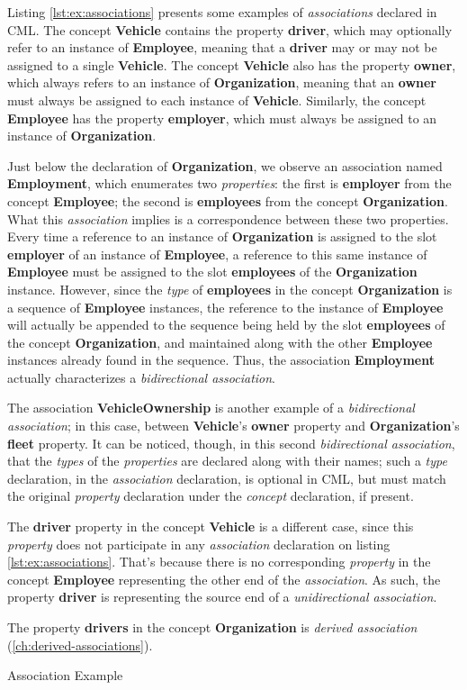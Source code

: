 Listing \ref{lst:ex:associations} presents some examples of \emph{associations} declared in CML.
The concept \textbf{Vehicle} contains the property \textbf{driver},
which may optionally refer to an instance of \textbf{Employee},
meaning that a \textbf{driver} may or may not be assigned to a single \textbf{Vehicle}.
The concept \textbf{Vehicle} also has the property \textbf{owner},
which always refers to an instance of \textbf{Organization},
meaning that an \textbf{owner} must always be assigned to each instance of \textbf{Vehicle}.
Similarly,
the concept \textbf{Employee} has the property \textbf{employer},
which must always be assigned to an instance of \textbf{Organization}.

Just below the declaration of \textbf{Organization},
we observe an association named \textbf{Employment},
which enumerates two \emph{properties}:
the first is \textbf{employer} from the concept \textbf{Employee};
the second is \textbf{employees} from the concept \textbf{Organization}.
What this \emph{association} implies is a correspondence between these two properties.
Every time a reference to an instance of \textbf{Organization} is assigned to
the slot \textbf{employer} of an instance of \textbf{Employee},
a reference to this same instance of \textbf{Employee} must be assigned to
the slot \textbf{employees} of the \textbf{Organization} instance.
However,
since the \emph{type} of \textbf{employees}
in the concept \textbf{Organization}
is a sequence of \textbf{Employee} instances,
the reference to the instance of \textbf{Employee} will actually be appended to the sequence
being held by the slot \textbf{employees} of the concept \textbf{Organization},
and maintained along with the other \textbf{Employee} instances already found in the sequence.
Thus, the association \textbf{Employment} actually characterizes a \emph{bidirectional association}.

The association \textbf{VehicleOwnership} is another example of a \emph{bidirectional association};
in this case,
between \textbf{Vehicle}'s \textbf{owner} property and \textbf{Organization}'s \textbf{fleet} property.
It can be noticed, though,
in this second \emph{bidirectional association},
that the \emph{types} of the \emph{properties} are declared along with their names;
such a \emph{type} declaration,
in the \emph{association} declaration,
is optional in CML,
but must match the original \emph{property} declaration under the \emph{concept} declaration,
if present.

The \textbf{driver} property in the concept \textbf{Vehicle} is a different case,
since this \emph{property} does not participate in any \emph{association} declaration
on listing \ref{lst:ex:associations}.
That's because there is no corresponding \emph{property} in the concept \textbf{Employee}
representing the other end of the \emph{association}.
As such, the property \textbf{driver} is representing the source end of a \emph{unidirectional association}.

The property \textbf{drivers} in the concept \textbf{Organization}
is \emph{derived association} (\ref{ch:derived-associations}).

\begin{code}
\verbatimfont{\small}

\caption{Association Example}
\label{lst:ex:associations}
\end{code}
